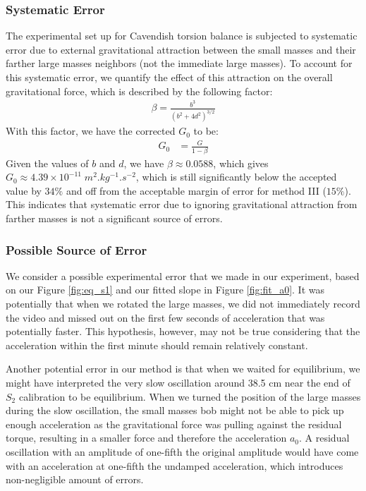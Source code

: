 \documentclass{article}
\begin{document}
\subsubsection{Systematic Error}
The experimental set up for Cavendish torsion balance is subjected to systematic error due to external gravitational attraction between the small masses and their farther large masses neighbors (not the immediate large masses). To account for this systematic error, we quantify the effect of this attraction on the overall gravitational force, which is described by the following factor:
\begin{align}
    \beta = \frac{b^3}{(b^2 + 4d^2)^{3/2}}
\end{align}
With this factor, we have the corrected $G_0$ to be:
\begin{align}
    G_0 &= \frac{G}{1 - \beta}
\end{align}
Given the values of $b$ and $d$, we have $\beta \approx 0.0588$, which gives $G_0 \approx 4.39 \times 10^{-11} \; \si{m^2.kg^{-1}.s^{-2}}$, which is still significantly below the accepted value by $34\%$ and off from the acceptable margin of error for method III ($15\%$). This indicates that systematic error due to ignoring gravitational attraction from farther masses is not a significant source of errors. 

\subsubsection{Possible Source of Error}

We consider a possible experimental error that we made in our experiment, based on our Figure \ref{fig:eq_s1} and our fitted slope in Figure \ref{fig:fit_a0}. It was potentially that when we rotated the large masses, we did not immediately record the video and missed out on the first few seconds of acceleration that was potentially faster. This hypothesis, however, may not be true considering that the acceleration within the first minute should remain relatively constant. 

Another potential error in our method is that when we waited for equilibrium, we might have interpreted the very slow oscillation around 38.5 cm near the end of $S_2$ calibration to be equilibrium. When we turned the position of the large masses during the slow oscillation, the small masses bob might not be able to pick up enough acceleration as the gravitational force was pulling against the residual torque, resulting in a smaller force and therefore the acceleration $a_0$. A residual oscillation with an amplitude of one-fifth the original amplitude would have come with an acceleration at one-fifth the undamped acceleration, which introduces non-negligible amount of errors. 
\end{document}
